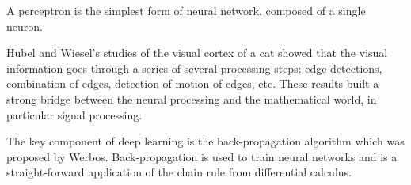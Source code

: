 \documentclass[c,8pt]{beamer}
\begin{document}
\begin{frame}{}{}
{  A perceptron is the simplest form of neural network, composed of a
  single neuron.

  Hubel and Wiesel's studies of the visual cortex of a cat showed that
  the visual information goes through a series of several processing
  steps: edge detections, combination of edges, detection of motion of
  edges, {etc.} These results built a strong bridge between the neural
  processing and the mathematical world, in particular signal
  processing.

  The key component of deep learning is the back-propagation algorithm
  which was proposed by Werbos. Back-propagation is used to train
  neural networks and is a straight-forward application of the chain
  rule from differential calculus.

}

\end{frame}


\end{document}
